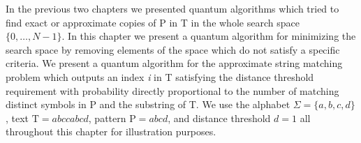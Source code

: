 In the previous two chapters we presented quantum algorithms which tried to find exact or approximate copies of P in T in the whole search space $\{0,\ldots,N-1\}$. In this chapter we present a quantum algorithm for minimizing the search space by removing elements of the space which do not satisfy a specific criteria. We present a quantum algorithm for the approximate string matching problem which outputs an index \textit{i} in T satisfying the distance threshold requirement with probability directly proportional to the number of matching distinct symbols in P and the substring of T. We use the alphabet $\Sigma=\{a,b,c,d\}$, text $\text{T}= abccabcd$, pattern $\text{P}= abcd$, and distance threshold $d=1$ all throughout this chapter for illustration purposes.



